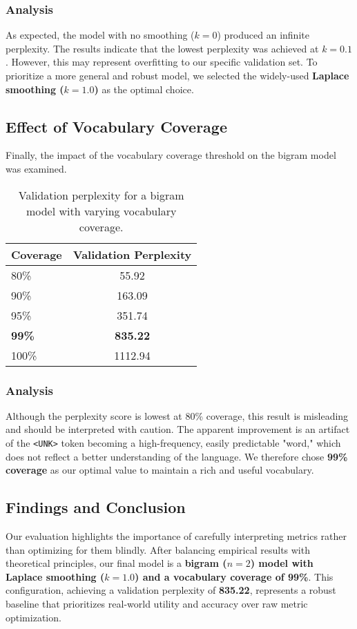 \documentclass[a4paper]{article}
\begin{document}
\subsubsection{Analysis}
As expected, the model with no smoothing ($k=0$) produced an infinite perplexity. The results indicate that the lowest perplexity was achieved at $k=0.1$. However, this may represent overfitting to our specific validation set. To prioritize a more general and robust model, we selected the widely-used \textbf{Laplace smoothing ($k=1.0$)} as the optimal choice.

\subsection{Effect of Vocabulary Coverage}
Finally, the impact of the vocabulary coverage threshold on the bigram model was examined.

\begin{table}[h!]
\centering
\begin{tabular}{|l|c|}
\hline
\textbf{Coverage} & \textbf{Validation Perplexity} \\
\hline
80\% & 55.92 \\
90\% & 163.09 \\
95\% & 351.74 \\
\textbf{99\%} & \textbf{835.22} \\
100\% & 1112.94 \\
\hline
\end{tabular}
\caption{Validation perplexity for a bigram model with varying vocabulary coverage.}
\label{tab:coverage_perplexity}
\end{table}

\subsubsection{Analysis}
Although the perplexity score is lowest at 80\% coverage, this result is misleading and should be interpreted with caution. The apparent improvement is an artifact of the \texttt{<UNK>} token becoming a high-frequency, easily predictable "word," which does not reflect a better understanding of the language. We therefore chose \textbf{99\% coverage} as our optimal value to maintain a rich and useful vocabulary.

\subsection{Findings and Conclusion}
Our evaluation highlights the importance of carefully interpreting metrics rather than optimizing for them blindly. After balancing empirical results with theoretical principles, our final model is a \textbf{bigram ($n=2$) model with Laplace smoothing ($k=1.0$) and a vocabulary coverage of 99\%}. This configuration, achieving a validation perplexity of \textbf{835.22}, represents a robust baseline that prioritizes real-world utility and accuracy over raw metric optimization.
\end{document}
